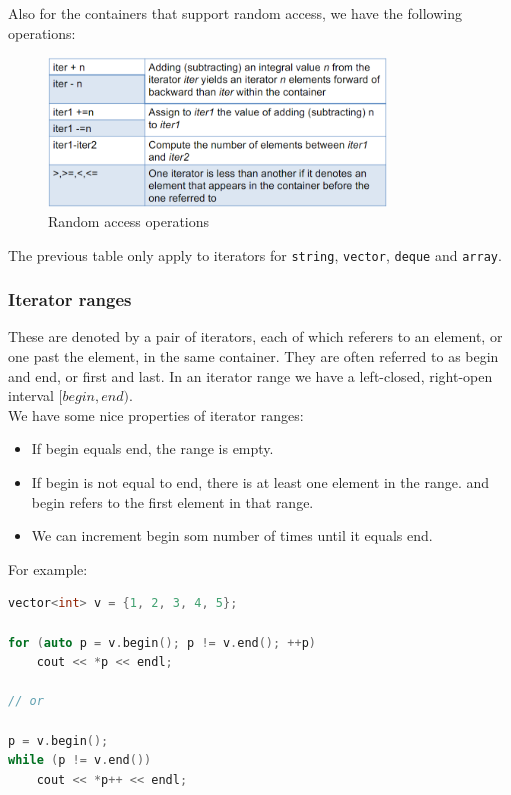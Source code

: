 Also for the containers that support random access, we have the following operations:

\begin{figure}[H]
    \centering
    \includegraphics[width=0.8\textwidth]{figures/it_random_access.png}
    \caption{Random access operations}
    \label{fig:it_random_access}
\end{figure}

The previous table only apply to iterators for \texttt{string}, \texttt{vector}, \texttt{deque}
and \texttt{array}.

\subsubsection{Iterator ranges}

These are denoted by a pair of iterators, each of which referers to an element, or one past the
element, in the same container. They are often referred to as begin and end, or first and last.
In an iterator range we have a left-closed, right-open interval $[begin, end)$.\\

We have some nice properties of iterator ranges:

\begin{itemize}
    \item If begin equals end, the range is empty.
    \item If begin is not equal to end, there is at least one element in the range.
    and begin refers to the first element in that range.
    \item We can increment begin som number of times until it equals end.
\end{itemize}

For example:

\begin{lstlisting}[language=C++]
vector<int> v = {1, 2, 3, 4, 5};

for (auto p = v.begin(); p != v.end(); ++p)
    cout << *p << endl;

// or

p = v.begin();
while (p != v.end())
    cout << *p++ << endl;
\end{lstlisting}


